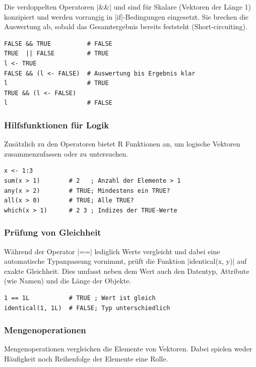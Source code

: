 \documentclass[10pt,twocolumn]{scrartcl}
\renewcommand{\lstinline}{\mycoloredinline}
\begin{document}
Die verdoppelten Operatoren \lstinline|&&| und \lstinline{||} sind für Skalare (Vektoren der Länge 1) konzipiert und werden vorrangig in \lstinline|if|-Bedingungen eingesetzt. Sie brechen die Auswertung ab, sobald das Gesamtergebnis bereits feststeht (Short-circuiting).

\begin{lstlisting}
FALSE && TRUE          # FALSE
TRUE  || FALSE         # TRUE
l <- TRUE
FALSE && (l <- FALSE)  # Auswertung bis Ergebnis klar
l                      # TRUE
TRUE && (l <- FALSE)
l                      # FALSE
\end{lstlisting}

\subsubsection{Hilfsfunktionen für Logik}

Zusätzlich zu den Operatoren bietet R Funktionen an, um logische Vektoren zusammenzufassen oder zu untersuchen.

\begin{lstlisting}
x <- 1:3
sum(x > 1)        # 2   ; Anzahl der Elemente > 1
any(x > 2)        # TRUE; Mindestens ein TRUE?
all(x > 0)        # TRUE; Alle TRUE?
which(x > 1)      # 2 3 ; Indizes der TRUE-Werte
\end{lstlisting}

\subsubsection{Prüfung von Gleichheit}

Während der Operator \lstinline|==| lediglich Werte vergleicht und dabei eine automatische Typanpassung vornimmt, prüft die Funktion \lstinline|identical(x, y)| auf exakte Gleichheit. Dies umfasst neben dem Wert auch den Datentyp, Attribute (wie Namen) und die Länge der Objekte.

\begin{lstlisting}
1 == 1L           # TRUE ; Wert ist gleich
identical(1, 1L)  # FALSE; Typ unterschiedlich
\end{lstlisting}


\subsubsection{Mengenoperationen}

Mengenoperationen vergleichen die Elemente von Vektoren. Dabei spielen weder Häufigkeit noch Reihenfolge der Elemente eine Rolle.
\end{document}
